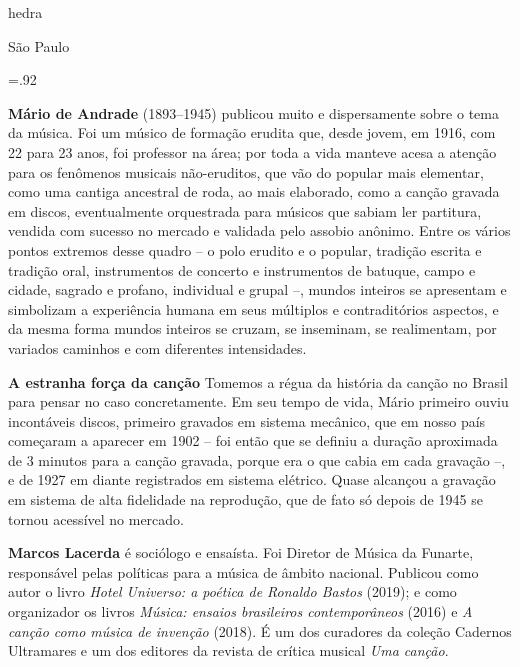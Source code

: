               \newfontfamily{}
              {\fontsize{30}{40}\selectfont \timesnewroman hedra}
              
              \medskip

              {\selectfont\minion\small
              São Paulo \quad\the\year}
\endgroup
\pagebreak

\begingroup 

\footnotesize\parindent0pt\parskip5pt\thispagestyle{empty} 
\vspace*{.1\textheight}\mbox{} \vfill
\baselineskip=.92\baselineskip
\thispagestyle{empty}

\textbf{Mário de Andrade} (1893--1945) publicou muito e dispersamente sobre o tema da música. Foi um músico de formação erudita que, desde jovem, em 1916, com 22 para 23 anos, foi professor na área; por toda a vida manteve acesa a atenção para os fenômenos musicais não-eruditos, que vão do popular mais elementar, como uma cantiga ancestral de roda, ao mais elaborado, como a canção gravada em discos, eventualmente orquestrada para músicos que sabiam ler partitura, vendida com sucesso no mercado e validada pelo assobio anônimo. Entre os vários pontos extremos desse quadro – o polo erudito e o popular, tradição escrita e tradição oral, instrumentos de concerto e instrumentos de batuque, campo e cidade, sagrado e profano, individual e grupal –, mundos inteiros se apresentam e simbolizam a experiência humana em seus múltiplos e contraditórios aspectos, e da mesma forma mundos inteiros se cruzam, se inseminam, se realimentam, por variados caminhos e com diferentes intensidades. 

\textbf{A estranha força da canção} Tomemos a régua da história da canção no Brasil para pensar no caso concretamente. Em seu tempo de vida, Mário primeiro ouviu incontáveis discos, primeiro gravados em sistema mecânico, que em nosso país começaram a aparecer em 1902 – foi então que se definiu a duração aproximada de 3 minutos para a canção gravada, porque era o que cabia em cada gravação –, e de 1927 em diante registrados em sistema elétrico. Quase alcançou a gravação em sistema de alta fidelidade na reprodução, que de fato só depois de 1945 se tornou acessível no mercado.

\textbf{Marcos Lacerda} é sociólogo e ensaísta. Foi Diretor de Música da Funarte, responsável pelas políticas para a música de âmbito nacional. Publicou como autor o livro \textit{Hotel Universo: a poética de Ronaldo Bastos} (2019); e como organizador os livros \textit{Música: ensaios brasileiros contemporâneos} (2016) e \textit{A canção como música de invenção} (2018). É um dos curadores da coleção Cadernos Ultramares e um dos editores da revista de crítica musical \textit{Uma canção}. 

\endgroup
\pagebreak
